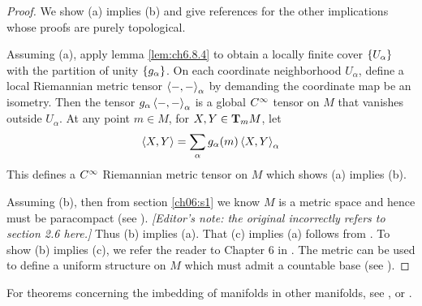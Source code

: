 \documentclass[../main]{subfiles}
\begin{document}
\begin{proof}
We show (a) implies (b) and give references for the other implications whose proofs are purely topological.

Assuming (a), apply lemma \ref{lem:ch6.8.4} to obtain a locally finite cover $\brc{U_\alpha}$ with the partition of unity $\brc{g_\alpha}$. On each coordinate neighborhood $U_\alpha$, define a local Riemannian metric tensor $\ip{-}{-}_\alpha$ by demanding the coordinate map be an isometry. Then the tensor $g_\alpha\ip{-}{-}_\alpha$ is a global $\CInfty$ tensor on $M$ that vanishes outside $U_\alpha$. At any point $m\in M$, for $X,Y\in\ts Mm$, let
\[\ip{X}{Y}=\sum_\alpha g_\alpha(m)\ip{X}{Y}_\alpha\]
This defines a $\CInfty$ Riemannian metric tensor on $M$ which shows (a) implies (b).

Assuming (b), then from section \ref{ch06:s1} we know $M$ is a metric space and hence must be paracompact (see \cite[p. 160]{kelley2017general}). \emph{[Editor's note: the original incorrectly refers to section 2.6 here.]} Thus (b) implies (a). That (c) implies (a) follows from \cite[p. 79]{hocking2012topology}. To show (b) implies (c), we refer the reader to Chapter 6 in \cite{kelley2017general}. The metric can be used to define a uniform structure on $M$ which must admit a countable base (see \cite[p. 186]{kelley2017general}).
\end{proof}



For theorems concerning the imbedding of manifolds in other manifolds, see \cite{sternberg1964lectures}, \cite{auslander2012introduction} or \cite{Smale1963a}.
\end{document}

